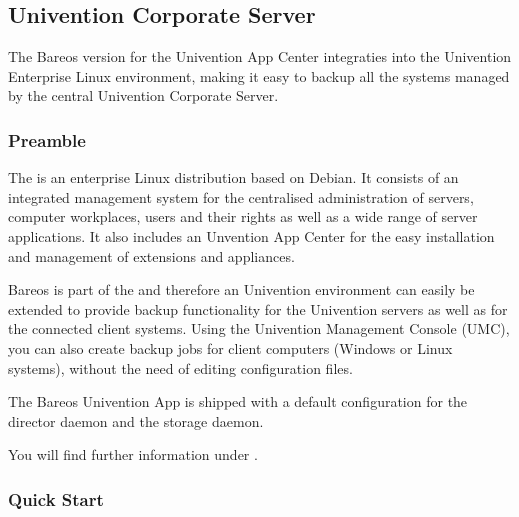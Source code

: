 \subsection{Univention Corporate Server}
\label{sec:UniventionCorporateServer}
The Bareos version for the Univention App Center integraties into the Univention Enterprise Linux environment, making it easy to backup all the systems managed by the central Univention Corporate Server.

\subsubsection{Preamble}

The  is an enterprise Linux distribution based on Debian. It consists of an integrated management system for the centralised administration of servers, computer workplaces, users and their rights as well as a wide range of server applications. It also includes an Unvention App Center
for the easy installation and management of extensions and appliances.

Bareos is part of the 
and therefore an Univention environment can easily be extended to provide backup functionality for the Univention servers as well as for the connected client systems. Using the Univention Management Console (UMC), you can also create backup jobs for client computers (Windows or Linux systems), without the need of editing configuration files.

The Bareos Univention App is shipped with a default configuration for the director daemon and the storage daemon.


You will find further information under .

\subsubsection{Quick Start}

